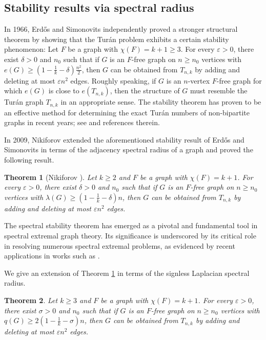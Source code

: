 \documentclass[11pt,a4paper]{article}
\theoremstyle{plain}
\newtheorem{theorem}{Theorem}[section]
\theoremstyle{definition}
\begin{document}
\subsection{Stability results via spectral radius}


In 1966, 
Erd\H{o}s \cite{Erd1966Sta1,Erd1966Sta2} and Simonovits \cite{S1968} independently  proved a stronger structural theorem by showing that the Tur\'{a}n problem exhibits a certain stability phenomenon: 
Let $F$ be a graph with $\chi (F)=k+1\ge 3$. 
For every $\varepsilon >0$, 
there exist $\delta >0$ and $n_0$ such that 
if $G$ is an $F$-free graph on $n\ge n_0$ vertices with $e(G)\ge (1- \frac{1}{k} - \delta) \frac{n^2}{2}$, then $G$ can be obtained from $T_{n,k}$ 
by adding and deleting at most $\varepsilon n^2$ edges. Roughly speaking, if $G$ is an $n$-vertex 
 $F$-free graph for which $e(G)$ is close to $e(T_{n,k})$, then the structure of $G$ must resemble the Tur\'{a}n graph $T_{n,k}$ in an appropriate sense. 
The stability theorem has proven to be an effective method for determining the exact Tur\'{a}n numbers of non-bipartite graphs in recent years; see \cite[Sec. 5]{Kee2011} and references therein.  


 In 2009, Nikiforov \cite{Niki2009jgt} extended the aforementioned stability result of Erd\H{o}s and Simonovits in terms of the adjacency spectral radius of a graph and proved the following result.  



\begin{theorem}[Nikiforov \cite{Niki2009jgt}] \label{thm-Nik-stability}
Let $k\ge 2$ and $F$ be a graph with $\chi (F)=k+1$. For every $\varepsilon >0$,  
there exist $\delta >0$ and $n_0$ such that 
if $G$ is an $F$-free graph on $n\ge n_0$ vertices with 
$\lambda(G)\ge (1- \frac{1}{k} - \delta) n$, 
 then $G$ can be obtained from $T_{n,k}$ 
by adding and deleting at most $\varepsilon n^2$ edges.  
\end{theorem}


The spectral stability theorem has emerged as a pivotal and fundamental tool in spectral extremal graph theory. Its significance is underscored by its critical role in resolving numerous spectral extremal problems, as evidenced by recent applications in works such as \cite{DKLNTW2021, FTZ2024, NWK2022, Wang2022}. 

We give an extension of Theorem \ref{thm-Nik-stability} in terms of the signless Laplacian spectral radius. 



\begin{theorem}\label{sst}
Let $k\ge 3$ and $F$ be a graph with $\chi(F)=k+1$. For every $\varepsilon>0$, there exist $\sigma>0$ and $n_{0}$ such that
if $G$ is an $F$-free graph on $n\geq n_{0}$ vertices with $q(G)\geq2(1- \frac{1}{k}-\sigma)n$,  then $G$ can be obtained from $T_{n,k}$ 
by adding and deleting at most $\varepsilon n^2$ edges. 
\end{theorem}
\end{document}
